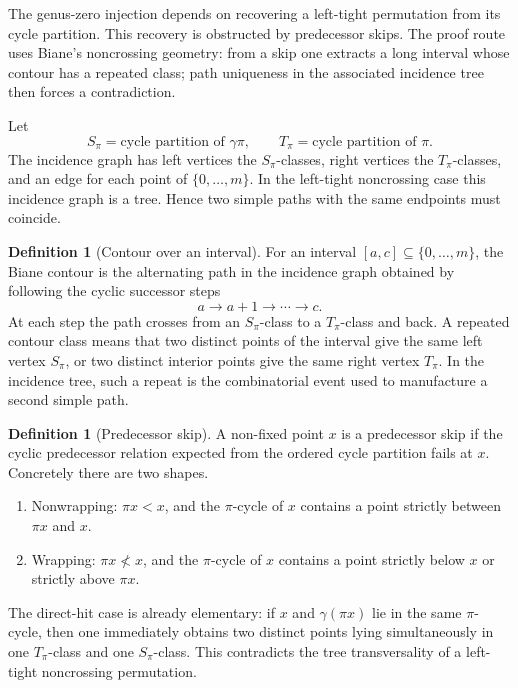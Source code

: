 \documentclass[11pt]{article}
\theoremstyle{plain}
\theoremstyle{definition}
\newtheorem{definition}[theorem]{Definition}
\theoremstyle{remark}
\newcommand{\g}{\gamma}
\newcommand{\p}{\pi}
\begin{document}
The genus-zero injection depends on recovering a left-tight permutation from
its cycle partition.  This recovery is obstructed by predecessor skips.  The
proof route uses Biane's noncrossing geometry: from a skip one extracts a long
interval whose contour has a repeated class; path uniqueness in the associated
incidence tree then forces a contradiction.

Let
\[
  S_\p=\text{cycle partition of }\g\p,\qquad
  T_\p=\text{cycle partition of }\p.
\]
The incidence graph has left vertices the \(S_\p\)-classes, right vertices the
\(T_\p\)-classes, and an edge for each point of \(\{0,\ldots,m\}\).  In the
left-tight noncrossing case this incidence graph is a tree.  Hence two simple
paths with the same endpoints must coincide.

\begin{definition}[Contour over an interval]
For an interval \([a,c]\subseteq\{0,\ldots,m\}\), the Biane contour is the
alternating path in the incidence graph obtained by following the cyclic
successor steps
\[
  a\to a+1\to \cdots\to c.
\]
At each step the path crosses from an \(S_\p\)-class to a \(T_\p\)-class and
back.  A repeated contour class means that two distinct points of the interval
give the same left vertex \(S_\p\), or two distinct interior points give the
same right vertex \(T_\p\).  In the incidence tree, such a repeat is the
combinatorial event used to manufacture a second simple path.
\end{definition}

\begin{definition}[Predecessor skip]
A non-fixed point \(x\) is a predecessor skip if the cyclic predecessor
relation expected from the ordered cycle partition fails at \(x\).  Concretely
there are two shapes.
\begin{enumerate}[label=(\roman*)]
\item Nonwrapping: \(\p x<x\), and the \(\p\)-cycle of \(x\) contains a point
strictly between \(\p x\) and \(x\).
\item Wrapping: \(\p x\not <x\), and the \(\p\)-cycle of \(x\) contains a point
strictly below \(x\) or strictly above \(\p x\).
\end{enumerate}
\end{definition}

The direct-hit case is already elementary: if \(x\) and \(\g(\p x)\) lie in
the same \(\p\)-cycle, then one immediately obtains two distinct points lying
simultaneously in one \(T_\p\)-class and one \(S_\p\)-class.  This contradicts
the tree transversality of a left-tight noncrossing permutation.
\end{document}

